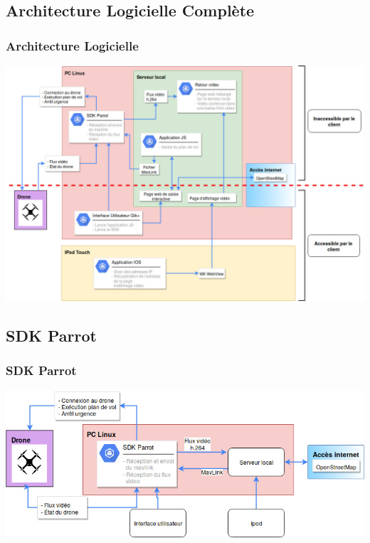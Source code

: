 \documentclass{beamer}
\begin{document}
	\begin{frame}
		\section{Architecture Logicielle Complète}
		\begin{center}
		\frametitle{Architecture Logicielle}
       
        \includegraphics[scale=0.3]{Architecture_logicielle_composants/Architecture_logicielle_v2.jpg}
		\end{center}
	\end{frame}
	
	
	
	\begin{frame}
		\section{SDK Parrot}
		\begin{center}
		\frametitle{SDK Parrot}
		\includegraphics[scale=0.4]{Architecture_logicielle_composants/SDK.jpg}
		\end{center}	
	\end{frame}
	
\end{document}
